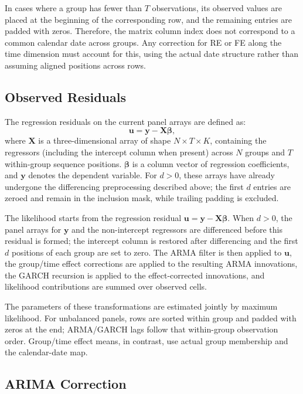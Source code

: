 \documentclass[12pt]{article}
\begin{document}
In cases where a group has fewer than $T$ observations, its observed values are placed at the beginning of the corresponding row, and the remaining entries are padded with zeros. Therefore, the matrix column index does not correspond to a common calendar date across groups. Any correction for RE or FE along the time dimension must account for this, using the actual date structure rather than assuming aligned positions across rows.

\subsection{Observed Residuals}

The regression residuals on the current panel arrays are defined as:
\begin{equation}
\mathbf{u}
= \mathbf{y} - \mathbf{X} \boldsymbol{\beta},
\label{eq:udef}
\end{equation}
where $\mathbf{X}$ is a three-dimensional array of shape $N \times T \times K$, containing the regressors (including the intercept column when present) across $N$ groups and $T$ within-group sequence positions. $\boldsymbol{\beta}$ is a column vector of regression coefficients, and $\mathbf{y}$ denotes the dependent variable. For $d>0$, these arrays have already undergone the differencing preprocessing described above; the first $d$ entries are zeroed and remain in the inclusion mask, while trailing padding is excluded.

The likelihood starts from the regression residual $\mathbf{u}=\mathbf{y}-\mathbf{X}\boldsymbol{\beta}$. When $d>0$, the panel arrays for $\mathbf{y}$ and the non-intercept regressors are differenced before this residual is formed; the intercept column is restored after differencing and the first $d$ positions of each group are set to zero. The ARMA filter is then applied to $\mathbf{u}$, the group/time effect corrections are applied to the resulting ARMA innovations, the GARCH recursion is applied to the effect-corrected innovations, and likelihood contributions are summed over observed cells.

The parameters of these transformations are estimated jointly by maximum likelihood. For unbalanced panels, rows are sorted within group and padded with zeros at the end; ARMA/GARCH lags follow that within-group observation order. Group/time effect means, in contrast, use actual group membership and the calendar-date map.


\subsection{ARIMA Correction}
\end{document}
